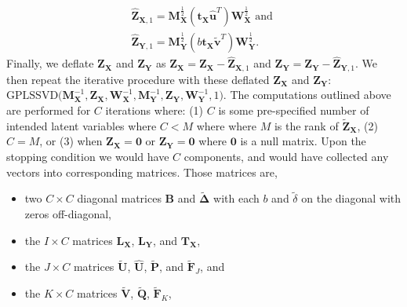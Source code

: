 \documentclass[12pt]{article}
\begin{document}
\begin{equation}
\begin{aligned}
\widehat{\mathbf Z}_{{\mathbf X},1} = {\mathbf M}_{\mathbf X}^{\frac{1}{2}}({\mathbf t}_{\mathbf X}\widehat{\mathbf u}^{T}){\mathbf W}_{\mathbf X}^{\frac{1}{2}} \text{ and } \\
\widehat{\mathbf Z}_{{\mathbf Y},1} = {\mathbf M}_{\mathbf Y}^{\frac{1}{2}}(b{\mathbf t}_{\mathbf X}\widetilde{\mathbf v}^{T}){\mathbf W}_{\mathbf Y}^{\frac{1}{2}}.
\label{eq:rank1_preds_plscar}
\end{aligned}
\end{equation} Finally, we deflate \({\mathbf Z}_{\mathbf X}\) and
\({\mathbf Z}_{\mathbf Y}\) as
\({\mathbf Z}_{\mathbf X} = {\mathbf Z}_{\mathbf X} - \widehat{\mathbf Z}_{{\mathbf X},1}\)
and
\({\mathbf Z}_{\mathbf Y} = {\mathbf Z}_{\mathbf Y} - \widehat{\mathbf Z}_{{\mathbf Y},1}\).
We then repeat the iterative procedure with these deflated
\({\mathbf Z}_{\mathbf X}\) and \({\mathbf Z}_{\mathbf Y}\):
\(\mathrm{GPLSSVD(} {\mathbf M}_{\mathbf X}^{-1}, {\mathbf Z}_{\mathbf X}, {\mathbf W}_{\mathbf X}^{-1}, {\mathbf M}_{\mathbf Y}^{-1}, {\mathbf Z}_{\mathbf Y}, {\mathbf W}_{\mathbf Y}^{-1}, 1 \mathrm{)}\).
The computations outlined above are performed for \(C\) iterations
where: (1) \(C\) is some pre-specified number of intended latent
variables where \(C < M\) where where \(M\) is the rank of
\(\widetilde{\mathbf Z}_{\mathbf X}\), (2) \(C=M\), or (3) when
\({\mathbf Z}_{\mathbf X} = {\mathbf 0}\) or
\({\mathbf Z}_{\mathbf Y} = {\mathbf 0}\) where \({\mathbf 0}\) is a
null matrix. Upon the stopping condition we would have \(C\) components,
and would have collected any vectors into corresponding matrices. Those
matrices are,

\begin{itemize}
\item
  two \(C \times C\) diagonal matrices \({\mathbf B}\) and
  \(\widetilde{\boldsymbol \Delta}\) with each \(b\) and
  \(\tilde\delta\) on the diagonal with zeros off-diagonal,
\item
  the \(I \times C\) matrices \({\mathbf L}_{\mathbf X}\),
  \({\mathbf L}_{\mathbf Y}\), and \({\mathbf T}_{\mathbf X}\),
\item
  the \(J \times C\) matrices \(\widetilde{\mathbf U}\),
  \(\widehat{\mathbf U}\), \(\widetilde{\mathbf P}\), and
  \(\widetilde{\mathbf F}_{J}\), and
\item
  the \(K \times C\) matrices \(\widetilde{\mathbf V}\),
  \(\widetilde{\mathbf Q}\), \(\widetilde{\mathbf F}_{K}\),
\end{itemize}
\end{document}
